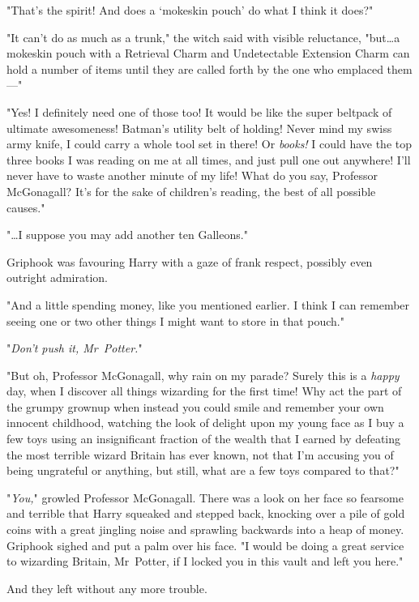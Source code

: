 "That's the spirit! And does a `mokeskin pouch' do what I think it does?"

"It can't do as much as a trunk," the witch said with visible reluctance,
"but…a mokeskin pouch with a Retrieval Charm and Undetectable Extension
Charm can hold a number of items until they are called forth by the one who
emplaced them---"

"Yes! I definitely need one of those too! It would be like the super beltpack
of ultimate awesomeness! Batman's utility belt of holding! Never mind my swiss
army knife, I could carry a whole tool set in there! Or \emph{books!} I could
have the top three books I was reading on me at all times, and just pull one
out anywhere! I'll never have to waste another minute of my life! What do you
say, Professor McGonagall? It's for the sake of children's reading, the best of
all possible causes."

"…I suppose you may add another ten Galleons."

Griphook was favouring Harry with a gaze of frank respect, possibly even
outright admiration.

"And a little spending money, like you mentioned earlier. I think I can
remember seeing one or two other things I might want to store in that pouch."

"\emph{Don't push it, Mr~Potter.}"

"But oh, Professor McGonagall, why rain on my parade? Surely this is a
\emph{happy} day, when I discover all things wizarding for the first time! Why
act the part of the grumpy grownup when instead you could smile and remember
your own innocent childhood, watching the look of delight upon my young face as
I buy a few toys using an insignificant fraction of the wealth that I earned by
defeating the most terrible wizard Britain has ever known, not that I'm
accusing you of being ungrateful or anything, but still, what are a few toys
compared to that?"

"\emph{You,}" growled Professor McGonagall. There was a look on her face so
fearsome and terrible that Harry squeaked and stepped back, knocking over a
pile of gold coins with a great jingling noise and sprawling backwards into a
heap of money. Griphook sighed and put a palm over his face. "I would be doing
a great service to wizarding Britain, Mr~Potter, if I locked you in this vault
and left you here."

And they left without any more trouble.
